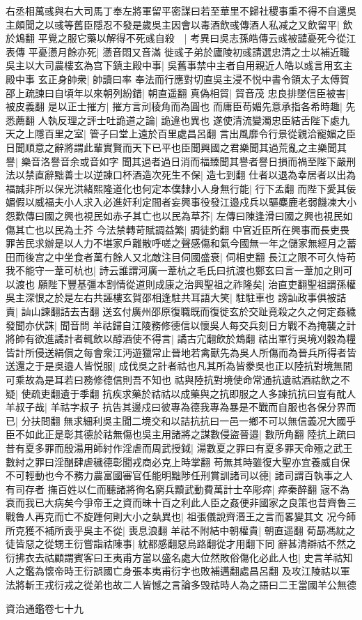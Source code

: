 右丞相萬彧與右大司馬丁奉左將軍留平密謀曰若至華里不歸社稷事重不得不自還吳主頗聞之以彧等舊臣隱忍不發是歲吳主因會以毒酒飲彧傳酒人私减之又飲留平|{
	飲於鴆翻}
平覺之服它藥以解得不死彧自殺　|{
	考異曰吳志孫皓傳云彧被譴憂死今從江表傳}
平憂懣月餘亦死|{
	懣音悶又音滿}
徙彧子弟於廬陵初彧請選忠清之士以補近職吳主以大司農樓玄為宫下鎮主殿中事|{
	吳舊事禁中主者自用親近人皓以彧言用玄主殿中事}
玄正身帥衆|{
	帥讀曰率}
奉法而行應對切直吳主浸不悦中書令領太子太傅賀邵上疏諫曰自頃年以來朝列紛錯|{
	朝直遥翻}
真偽相貿|{
	貿音茂}
忠良排墜信臣被害|{
	被皮義翻}
是以正士摧方|{
	摧方言刓稜角而為圓也}
而庸臣苟媚先意承指各希時趣|{
	先悉薦翻}
人執反理之評士吐詭道之論|{
	詭違也異也}
遂使清流變濁忠臣結舌陛下處九天之上隱百里之室|{
	管子曰堂上遠於百里處昌呂翻}
言出風靡令行景從親洽寵媚之臣日聞順意之辭將謂此輩實賢而天下已平也臣聞興國之君樂聞其過荒亂之主樂聞其譽|{
	樂音洛譽音余或音如字}
聞其過者過日消而福臻聞其譽者譽日損而禍至陛下嚴刑法以禁直辭黜善士以逆諫口杯酒造次死生不保|{
	造七到翻}
仕者以退為幸居者以出為福誠非所以保光洪緒熙隆道化也何定本僕隸小人身無行能|{
	行下孟翻}
而陛下愛其佞媚假以威福夫小人求入必進奸利定間者妄興事役發江邉戍兵以驅麋鹿老弱饑凍大小怨歎傳曰國之興也視民如赤子其亡也以民為草芥|{
	左傳曰陳逢滑曰國之興也視民如傷其亡也以民為土芥}
今法禁轉苛賦調益繁|{
	調徒釣翻}
中官近臣所在興事而長吏畏罪苦民求辦是以人力不堪家戶離散呼嗟之聲感傷和氣今國無一年之儲家無經月之蓄田而後宫之中坐食者萬冇餘人又北敵注目伺國盛衰|{
	伺相吏翻}
長江之限不可久恃苟我不能守一葦可杭也|{
	詩云誰謂河廣一葦杭之毛氏曰抗渡也鄭玄曰言一葦加之則可以渡也}
願陛下豐基彊本割情從道則成康之治興聖祖之祚隆矣|{
	治直吏翻聖祖謂孫權}
吳主深恨之於是左右共誣樓玄賀邵相逢駐共耳語大笑|{
	駐駐車也}
謗訕政事俱被詰責|{
	訕山諫翻詰去吉翻}
送玄付廣州邵原復職既而復徙玄於交趾竟殺之久之何定姦穢發聞亦伏誅|{
	聞音問}
羊祜歸自江陵務修德信以懷吳人每交兵刻日方戰不為掩襲之計將帥有欲進譎計者輒飲以醇酒使不得言|{
	譎古宂翻飲於鴆翻}
祜出軍行吳境刈穀為糧皆計所侵送絹償之每會衆江沔遊獵常止晉地若禽獸先為吳人所傷而為晉兵所得者皆送還之于是吳邉人皆悦服|{
	成伐吳之計者祜也凡其所為皆豢吳也正以陸抗對境無間可乘故為是耳若曰務修德信則吾不知也}
祜與陸抗對境使命常通抗遺祜酒祜飲之不疑|{
	使疏吏翻遺于季翻}
抗疾求藥於祜祜以成藥與之抗即服之人多諫抗抗曰豈有酖人羊叔子哉|{
	羊祜字叔子}
抗告其邊戍曰彼專為德我專為暴是不戰而自服也各保分界而已|{
	分扶問翻}
無求細利吳主聞二境交和以詰抗抗曰一邑一鄉不可以無信義况大國乎臣不如此正是彰其德於祜無傷也吳主用諸將之謀數侵盜晉邉|{
	數所角翻}
陸抗上疏曰昔有夏多罪而殷湯用師紂作淫虐而周武授鉞|{
	湯數夏之罪曰有夏多罪天命殛之武王數紂之罪曰淫酗肆虐穢德彰聞戎商必克上時掌翻}
苟無其時雖復大聖亦宜養威自保不可輕動也今不務力農富國審官任能明黜陟任刑賞訓諸司以德|{
	諸司謂百執事之人有司存者}
撫百姓以仁而聽諸將徇名窮兵黷武動費萬計士卒彫瘁|{
	瘁秦醉翻}
宼不為衰而我已大病矣今爭帝王之資而昧十百之利此人臣之姦便非國家之良策也昔齊魯三戰魯人再克而亡不旋踵何則大小之埶異也|{
	祖張儀說齊湣王之言而畧變其文}
况今師所克獲不補所喪乎吳主不從|{
	喪息浪翻}
羊祜不附結中朝權貴|{
	朝直遥翻}
荀勗馮紞之徒皆惡之從甥王衍嘗詣祜陳事|{
	紞都感翻惡烏路翻從才用翻下同}
辭甚清辯祜不然之衍拂衣去祜顧謂賓客曰王夷甫方當以盛名處大位然敗俗傷化必此人也|{
	史言羊祜知人之鑑為懷帝時王衍誤國亡身張本夷甫衍字也敗補邁翻處昌呂翻}
及攻江陵祜以軍法將斬王戎衍戎之從弟也故二人皆憾之言論多毁祜時人為之語曰二王當國羊公無德

資治通鑑卷七十九
